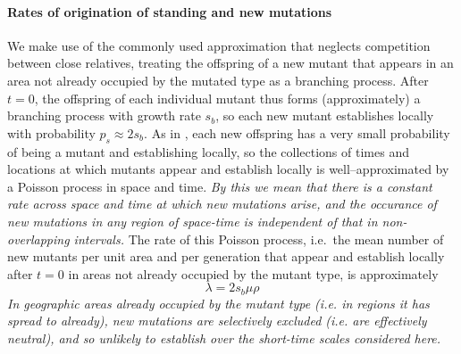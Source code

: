 \documentclass{article}
\newcommand{\gc}[1]{{\it\color{blue} #1} }
\begin{document}
\paragraph{Rates of origination of standing and new mutations}
We make use of the commonly used approximation that neglects competition between close relatives,
treating the offspring of a new mutant that appears in an area not already occupied by the mutated type
as a branching process.
After $t=0$, the offspring of each individual mutant thus forms (approximately) a branching process with growth rate $s_b$,
so each new mutant establishes locally with probability $p_s \approx 2s_b$.
As in \cite{ralphcoop2010}, each new offspring has a very small probability of being a mutant and establishing locally,
so the collections of times and locations at which mutants appear and establish locally 
is well--approximated by a Poisson process in space and time.
\gc{By this we mean that there is a constant rate across space and
  time at which new
  mutations arise, and the occurance of new mutations in any region of
  space-time is independent of that in non-overlapping intervals.}
The rate of this Poisson process,
i.e.\ the mean number of new mutants per unit area and per generation that
appear and establish locally after $t=0$ in areas not already occupied by the mutant type,
is approximately 
\begin{equation}
\lambda = 2 s_b \mu \rho 
\end{equation}
\gc{In geographic areas already
 occupied by the mutant type (i.e. in regions it has spread to already), new mutations are selectively excluded
 (i.e. are effectively neutral), and so unlikely to establish over the
 short-time scales considered here.  }
\end{document}
